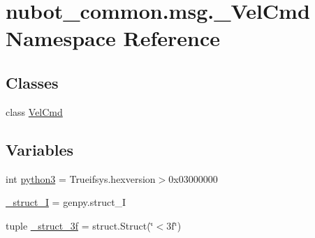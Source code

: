 \hypertarget{namespacenubot__common_1_1msg_1_1__VelCmd}{\section{nubot\-\_\-common.\-msg.\-\_\-\-Vel\-Cmd Namespace Reference}
\label{namespacenubot__common_1_1msg_1_1__VelCmd}
}
\subsection*{Classes}
\begin{DoxyCompactItemize}
\item 
class \hyperlink{classnubot__common_1_1msg_1_1__VelCmd_1_1VelCmd}{Vel\-Cmd}
\end{DoxyCompactItemize}
\subsection*{Variables}
\begin{DoxyCompactItemize}
\item 
int \hyperlink{namespacenubot__common_1_1msg_1_1__VelCmd_aa0b9b37915905ed527cc82b6a3a73eac}{python3} = Trueifsys.\-hexversion$>$0x03000000
\item 
\hyperlink{namespacenubot__common_1_1msg_1_1__VelCmd_ae6dd837722f842ce63a475878e949ff9}{\-\_\-struct\-\_\-\-I} = genpy.\-struct\-\_\-\-I
\item 
tuple \hyperlink{namespacenubot__common_1_1msg_1_1__VelCmd_a908ccffe79116a119d844ce4975148f8}{\-\_\-struct\-\_\-3f} = struct.\-Struct(\char`\"{}$<$3f\char`\"{})
\end{DoxyCompactItemize}


